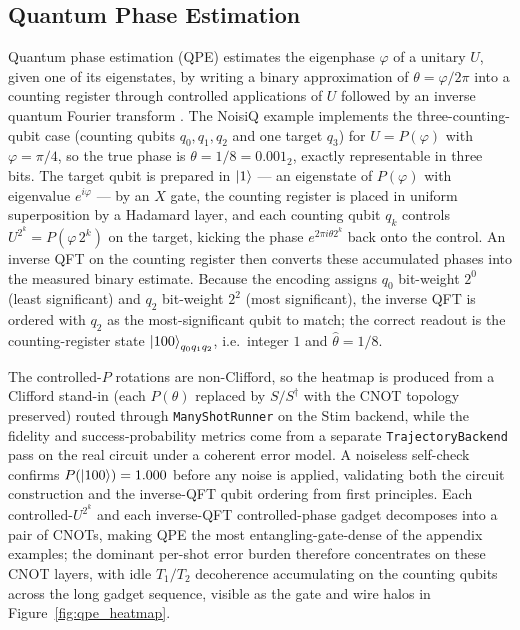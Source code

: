 \documentclass[10pt,twocolumn]{article}
\begin{document}
\subsection*{Quantum Phase Estimation}
\label{subsec:qpe}
Quantum phase estimation (QPE) estimates the eigenphase $\varphi$ of a unitary
$U$, given one of its eigenstates, by writing a binary approximation of
$\theta = \varphi/2\pi$ into a counting register through controlled applications
of $U$ followed by an inverse quantum Fourier transform
\cite{nielsenchuang2000}. The NoisiQ example implements the
three-counting-qubit case (counting qubits $q_0, q_1, q_2$ and one target
$q_3$) for $U = P(\varphi)$ with $\varphi = \pi/4$, so the true phase is
$\theta = 1/8 = 0.001_2$, exactly representable in three bits. The target qubit
is prepared in $\ket{1}$ --- an eigenstate of $P(\varphi)$ with eigenvalue
$e^{i\varphi}$ --- by an $X$ gate, the counting register is placed in uniform
superposition by a Hadamard layer, and each counting qubit $q_k$ controls
$U^{2^k} = P(\varphi\,2^k)$ on the target, kicking the phase
$e^{2\pi i \theta 2^k}$ back onto the control. An inverse QFT on the counting
register then converts these accumulated phases into the measured binary
estimate. Because the encoding assigns $q_0$ bit-weight $2^0$ (least
significant) and $q_2$ bit-weight $2^2$ (most significant), the inverse QFT is
ordered with $q_2$ as the most-significant qubit to match; the correct readout
is the counting-register state $\ket{100}_{q_0 q_1 q_2}$, i.e.\ integer $1$ and
$\hat\theta = 1/8$.

The controlled-$P$ rotations are non-Clifford, so the heatmap is produced from a
Clifford stand-in (each $P(\theta)$ replaced by $S/S^\dagger$ with the CNOT
topology preserved) routed through \texttt{ManyShotRunner} on the Stim backend,
while the fidelity and success-probability metrics come from a separate
\texttt{TrajectoryBackend} pass on the real circuit under a coherent error
model. A noiseless self-check confirms $P(\ket{100}) = 1.000$ before any noise
is applied, validating both the circuit construction and the inverse-QFT qubit
ordering from first principles. Each controlled-$U^{2^k}$ and each inverse-QFT
controlled-phase gadget decomposes into a pair of CNOTs, making QPE the most
entangling-gate-dense of the appendix examples; the dominant per-shot error
burden therefore concentrates on these CNOT layers, with idle $T_1/T_2$
decoherence accumulating on the counting qubits across the long gadget sequence,
visible as the gate and wire halos in Figure~\ref{fig:qpe_heatmap}.
\end{document}
